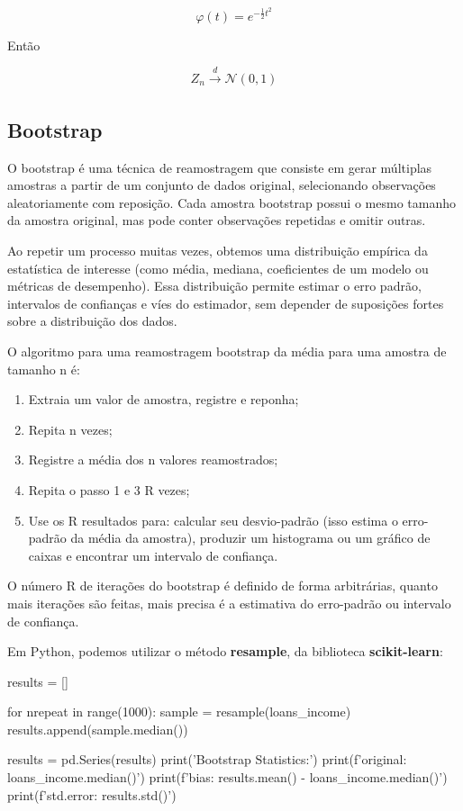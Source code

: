 \documentclass{article}
\begin{document}
\begin{equation*}
    \varphi(t) = e^{-\frac{1}{2}t^2}
\end{equation*}

Então

\begin{equation*}
    Z_n \xrightarrow[]{d} \mathcal{N}(0, 1)
\end{equation*}

\subsection{Bootstrap}

O bootstrap é uma técnica de reamostragem que consiste em gerar múltiplas amostras a partir de um conjunto de dados original, selecionando observações aleatoriamente com reposição. Cada amostra bootstrap possui o mesmo tamanho da amostra original, mas pode conter observações repetidas e omitir outras.

Ao repetir um processo muitas vezes, obtemos uma distribuição empírica da estatística de interesse (como média, mediana, coeficientes de um modelo ou métricas de desempenho). Essa distribuição permite estimar o erro padrão, intervalos de confianças e víes do estimador, sem depender de suposições fortes sobre a distribuição dos dados.

O algoritmo para uma reamostragem bootstrap da média para uma amostra de tamanho n é:

\begin{enumerate}
    \item Extraia um valor de amostra, registre e reponha;
    \item Repita n vezes;
    \item Registre a média dos n valores reamostrados;
    \item Repita o passo 1 e 3 R vezes;
    \item Use os R resultados para: calcular seu desvio-padrão (isso estima o erro-padrão da média da amostra), produzir um histograma ou um gráfico de caixas e encontrar um intervalo de confiança.
\end{enumerate}

O número R de iterações do bootstrap é definido de forma arbitrárias, quanto mais iterações são feitas, mais precisa é a estimativa do erro-padrão ou intervalo de confiança.

Em Python, podemos utilizar o método \textbf{resample}, da biblioteca \textbf{scikit-learn}:

\begin{pythoncode}
results = []

for nrepeat in range(1000):
    sample = resample(loans_income)
    results.append(sample.median())

results = pd.Series(results)
print('Bootstrap Statistics:')
print(f'original: {loans_income.median()}')
print(f'bias: {results.mean() - loans_income.median()}')
print(f'std.error: {results.std()}')
\end{pythoncode}
\end{document}
